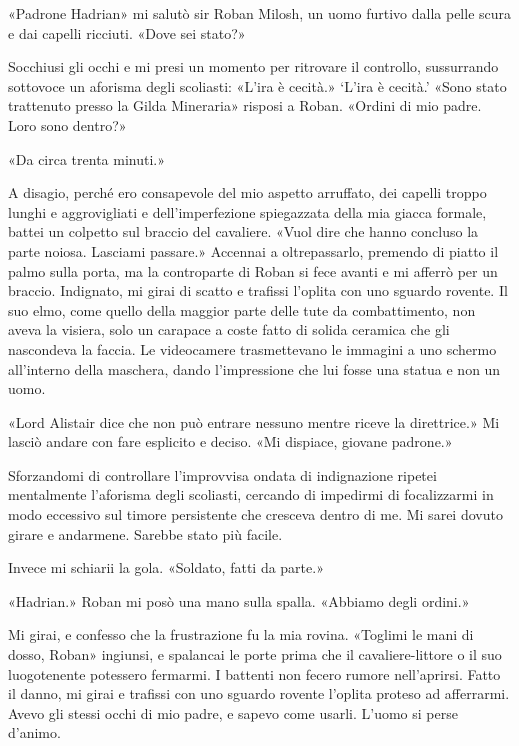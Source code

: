 «Padrone Hadrian» mi salutò sir Roban Milosh, un uomo furtivo dalla
pelle scura e dai capelli ricciuti. «Dove sei stato?»

Socchiusi gli occhi e mi presi un momento per ritrovare il controllo,
sussurrando sottovoce un aforisma degli scoliasti: «L'ira è cecità.»
`L'ira è cecità.' «Sono stato trattenuto presso la Gilda Mineraria»
risposi a Roban. «Ordini di mio padre. Loro sono dentro?»

«Da circa trenta minuti.»

A disagio, perché ero consapevole del mio aspetto arruffato, dei capelli
troppo lunghi e aggrovigliati e dell'imperfezione spiegazzata della mia
giacca formale, battei un colpetto sul braccio del cavaliere. «Vuol dire
che hanno concluso la parte noiosa. Lasciami passare.» Accennai a
oltrepassarlo, premendo di piatto il palmo sulla porta, ma la
controparte di Roban si fece avanti e mi afferrò per un braccio.
Indignato, mi girai di scatto e trafissi l'oplita con uno sguardo
rovente. Il suo elmo, come quello della maggior parte delle tute da
combattimento, non aveva la visiera, solo un carapace a coste fatto di
solida ceramica che gli nascondeva la faccia. Le videocamere
trasmettevano le immagini a uno schermo all'interno della maschera,
dando l'impressione che lui fosse una statua e non un uomo.

«Lord Alistair dice che non può entrare nessuno mentre riceve la
direttrice.» Mi lasciò andare con fare esplicito e deciso. «Mi dispiace,
giovane padrone.»

Sforzandomi di controllare l'improvvisa ondata di indignazione ripetei
mentalmente l'aforisma degli scoliasti, cercando di impedirmi di
focalizzarmi in modo eccessivo sul timore persistente che cresceva
dentro di me. Mi sarei dovuto girare e andarmene. Sarebbe stato più
facile.

Invece mi schiarii la gola. «Soldato, fatti da parte.»

«Hadrian.» Roban mi posò una mano sulla spalla. «Abbiamo degli ordini.»

Mi girai, e confesso che la frustrazione fu la mia rovina. «Toglimi le
mani di dosso, Roban» ingiunsi, e spalancai le porte prima che il
cavaliere-littore o il suo luogotenente potessero fermarmi. I battenti
non fecero rumore nell'aprirsi. Fatto il danno, mi girai e trafissi con
uno sguardo rovente l'oplita proteso ad afferrarmi. Avevo gli stessi
occhi di mio padre, e sapevo come usarli. L'uomo si perse d'animo.

